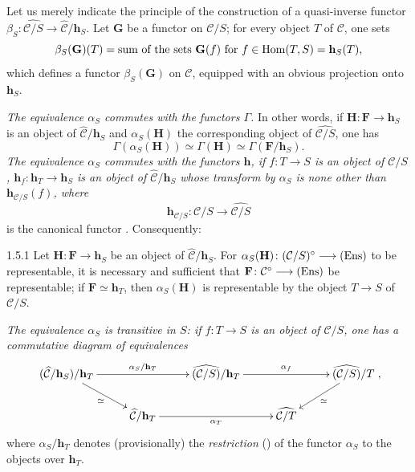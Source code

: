 Let us merely indicate the principle of the construction of a
quasi-inverse functor
\(\beta_{S}\colon\widehat{\mathcal{C}/S}
\to\widehat{\mathcal{C}}/\mathbf{h}_{S}\).
Let \(\mathbf{G}\) be a functor on \(\mathcal{C}/S\); for every object
\(T\) of \(\mathcal{C}\), one sets
\[
\beta_{S}(\mathbf{G})(T)
=\text{sum of the sets \(\mathbf{G}(f)\)
for \(f\in\operatorname{Hom}(T,S)=\mathbf{h}_{S}(T)\)},
\]
which defines a functor \(\beta_{S}(\mathbf{G})\) on \(\mathcal{C}\),
equipped with an obvious projection onto \(\mathbf{h}_{S}\).

\emph{The equivalence \(\alpha_{S}\) commutes with the functors
\(\Gamma\).}
In other words, if \(\mathbf{H}\colon\mathbf{F}\to\mathbf{h}_{S}\) is an
object of \(\widehat{\mathcal{C}}/\mathbf{h}_{S}\) and
\(\alpha_{S}(\mathbf{H})\) the corresponding object of
\(\widehat{\mathcal{C}/S}\), one has
\[
\Gamma(\alpha_{S}(\mathbf{H}))\simeq\Gamma(\mathbf{H})
\simeq\Gamma(\mathbf{F}/\mathbf{h}_{S}).
\]
\emph{The equivalence \(\alpha_{S}\) commutes with the functors
\(\mathbf{h}\), \ie if \(f\colon T\to S\) is an object of
\(\mathcal{C}/S\),
\(\mathbf{h}_{f}\colon\mathbf{h}_{T}\to\mathbf{h}_{S}\) is an object of
\(\widehat{\mathcal{C}}/\mathbf{h}_{S}\) whose transform by
\(\alpha_{S}\) is none other than \(\mathbf{h}_{\mathcal{C}/S}(f)\),
where}
\[
\mathbf{h}_{\mathcal{C}/S}\colon\mathcal{C}/S
\to\widehat{\mathcal{C}/S}
\]
is the canonical functor%
{\renewcommand{\thefootnote}{(11)}}.
Consequently:

\begin{proposition}{1.5.1}
\label{I.1.5.1}
Let \(\mathbf{H}\colon\mathbf{F}\to\mathbf{h}_{S}\) be an object of
\(\widehat{\mathcal{C}}/\mathbf{h}_{S}\). For
\(\alpha_{S}(\mathbf{H})\colon(\mathcal{C}/S)^{\circ}\longrightarrow\textup{(Ens)}\) to be
representable, it is necessary and sufficient that
\(\mathbf{F}\colon\mathcal{C}^{\circ}\longrightarrow\textup{(Ens)}\) be representable; if
\(\mathbf{F}\simeq\mathbf{h}_{T}\), then \(\alpha_{S}(\mathbf{H})\) is
representable by the object \(T\to S\) of \(\mathcal{C}/S\).
\end{proposition}

\emph{The equivalence \(\alpha_{S}\) is transitive in \(S\): if
\(f\colon T\to S\) is an object of \(\mathcal{C}/S\), one has a
commutative diagram of equivalences}
\[
\xymatrix@C=2.6em@R=1.8em{
(\widehat{\mathcal{C}}/\mathbf{h}_{S})/\mathbf{h}_{T}
  \ar[rr]^-{\alpha_{S}/\mathbf{h}_{T}}
  \ar[rd]_-{\simeq}
&&
\widehat{(\mathcal{C}/S)}/\mathbf{h}_{T}
  \ar[rr]^-{\alpha_{f}}
&&
\widehat{(\mathcal{C}/S)}/T
  \ar[ld]^-{\simeq}
\\
&
\widehat{\mathcal{C}}/\mathbf{h}_{T}
  \ar[rr]_-{\alpha_{T}}
&&
\widehat{\mathcal{C}/T}
&
},
\]
where \(\alpha_{S}/\mathbf{h}_{T}\) denotes (provisionally) the
\emph{restriction} () of the functor \(\alpha_{S}\) to the objects
over \(\mathbf{h}_{T}\).

